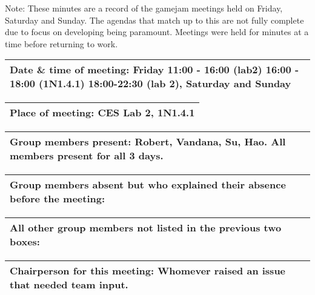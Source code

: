 \documentclass{article}
\begin{document}
Note: These minutes are a record of the gamejam meetings held on Friday, Saturday and Sunday. The agendas that match up to this are not fully complete due to focus on developing being paramount. Meetings were held for minutes at a time before returning to work. 

\begin{table}[H]
	\centering
	\begin{tabular}{| p{12cm}  |}
	\hline
	Date \& time of meeting: Friday 11:00 - 16:00 (lab2) 16:00 - 18:00 (1N1.4.1) 18:00-22:30 (lab 2), Saturday and Sunday \\ \hline
\end{tabular}
\end{table}

\begin{table}[H]
	\centering
	\begin{tabular}{| p{12cm}  |}
	\hline
	Place of meeting: CES Lab 2, 1N1.4.1\\ \hline
\end{tabular}
\end{table}

\begin{table}[H]
	\centering
	\begin{tabular}{| p{12cm}  |}
	\hline
	Group members present: Robert, Vandana, Su, Hao. All members present for all 3 days.\\ \hline
\end{tabular}
\end{table}

\begin{table}[H]
	\centering
	\begin{tabular}{| p{12cm}  |}
	\hline
	Group members absent but who explained their absence before the meeting: \\ \hline
\end{tabular}
\end{table}

\begin{table}[H]
	\centering
	\begin{tabular}{| p{12cm}  |}
	\hline
	All other group members not listed in the previous two boxes: \\ \hline
\end{tabular}
\end{table}

\begin{table}[H]
	\centering
	\begin{tabular}{| p{12cm}  |}
	\hline
	Chairperson for this meeting: Whomever raised an issue that needed team input.\\ \hline
\end{tabular}
\end{table}
\end{document}
